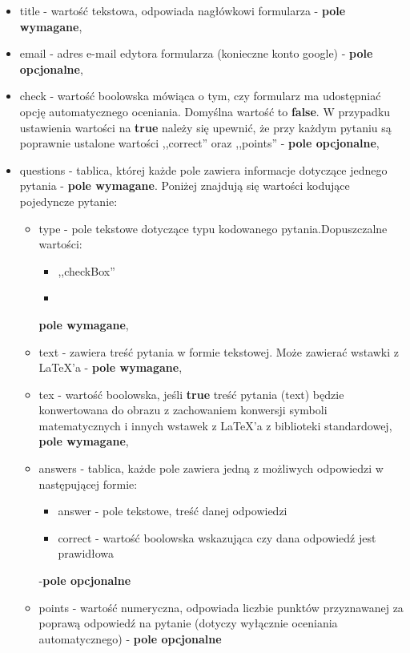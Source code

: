 \begin{itemize}
\item{title} - wartość tekstowa, odpowiada nagłówkowi formularza -  \textbf{pole wymagane},
\item{email} - adres e-mail edytora formularza (konieczne konto google) - \textbf{pole opcjonalne},
\item{check} - wartość boolowska mówiąca o tym, czy formularz ma udostępniać opcję automatycznego oceniania. Domyślna wartość to \textbf{false}. W przypadku ustawienia wartości na \textbf{true} należy się upewnić, że przy każdym pytaniu są poprawnie ustalone wartości ,,correct'' oraz ,,points'' - \textbf{pole opcjonalne},
\item{questions} - tablica, której każde pole zawiera informacje dotyczące jednego pytania - \textbf{pole wymagane}. Poniżej znajdują się wartości kodujące pojedyncze pytanie:
\begin{itemize}
\item{type} - pole tekstowe dotyczące typu kodowanego pytania.Dopuszczalne wartości:
\begin{itemize}
\item ,,checkBox''
\item
\end{itemize}
 \textbf{pole wymagane},
\item{text} - zawiera treść pytania w formie tekstowej. Może zawierać wstawki z \LaTeX{}'a - \textbf{pole wymagane},
\item{tex} - wartość boolowska, jeśli \textbf{true} treść pytania (text) będzie konwertowana do obrazu z zachowaniem konwersji symboli matematycznych i innych wstawek z \LaTeX{}'a z biblioteki standardowej, \textbf{pole wymagane},
\item{answers} - tablica, każde pole zawiera jedną z możliwych odpowiedzi w następującej formie:
\begin{itemize}
\item answer - pole tekstowe, treść danej odpowiedzi
\item correct - wartość boolowska wskazująca czy dana odpowiedź jest prawidłowa
\end{itemize} 
-\textbf{pole opcjonalne}
\item{points} - wartość numeryczna, odpowiada liczbie punktów przyznawanej za poprawą odpowiedź na pytanie (dotyczy wyłącznie oceniania automatycznego) - \textbf{pole opcjonalne}
\end{itemize}
\end{itemize}









